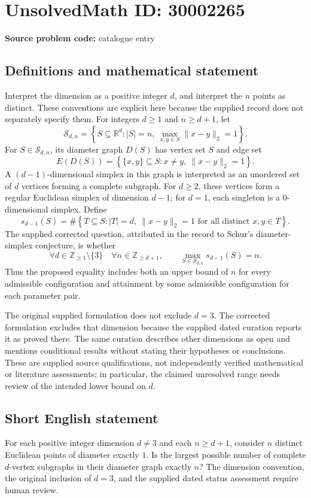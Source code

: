 \documentclass[11pt]{article}
\newcommand{\Z}{\mathbb{Z}}
\newcommand{\R}{\mathbb{R}}
\begin{document}
\section*{UnsolvedMath ID: 30002265}
\textbf{Source problem code:} catalogue entry
\subsection{Definitions and mathematical statement}
Interpret the dimension as a positive integer \(d\), and interpret the \(n\) points as distinct. These conventions are explicit here because the supplied record does not separately specify them. For integers \(d\geq 1\) and \(n\geq d+1\), let
\[
\mathcal S_{d,n}=\left\{S\subseteq\R^d: |S|=n,\ \max_{x,y\in S}\|x-y\|_2=1\right\}.
\]
For \(S\in\mathcal S_{d,n}\), its diameter graph \(D(S)\) has vertex set \(S\) and edge set
\[
E(D(S))=\left\{\{x,y\}\subseteq S:x\ne y,\ \|x-y\|_2=1\right\}.
\]
A \((d-1)\)-dimensional simplex in this graph is interpreted as an unordered set of \(d\) vertices forming a complete subgraph. For \(d\geq2\), these vertices form a regular Euclidean simplex of dimension \(d-1\); for \(d=1\), each singleton is a \(0\)-dimensional simplex. Define
\[
s_{d-1}(S)=\#\left\{T\subseteq S:|T|=d,\ \|x-y\|_2=1\text{ for all distinct }x,y\in T\right\}.
\]
The supplied corrected question, attributed in the record to Schur's diameter-simplex conjecture, is whether
\[
\forall d\in\Z_{\geq1}\setminus\{3\}\quad
\forall n\in\Z_{\geq d+1},\qquad
\max_{S\in\mathcal S_{d,n}}s_{d-1}(S)=n.
\]
Thus the proposed equality includes both an upper bound of \(n\) for every admissible configuration and attainment by some admissible configuration for each parameter pair.

The original supplied formulation does not exclude \(d=3\). The corrected formulation excludes that dimension because the supplied dated curation reports it as proved there. The same curation describes other dimensions as open and mentions conditional results without stating their hypotheses or conclusions. These are supplied source qualifications, not independently verified mathematical or literature assessments; in particular, the claimed unresolved range needs review of the intended lower bound on \(d\).
\subsection{Short English statement}
For each positive integer dimension \(d\ne3\) and each \(n\geq d+1\), consider \(n\) distinct Euclidean points of diameter exactly \(1\). Is the largest possible number of complete \(d\)-vertex subgraphs in their diameter graph exactly \(n\)? The dimension convention, the original inclusion of \(d=3\), and the supplied dated status assessment require human review.
\end{document}
